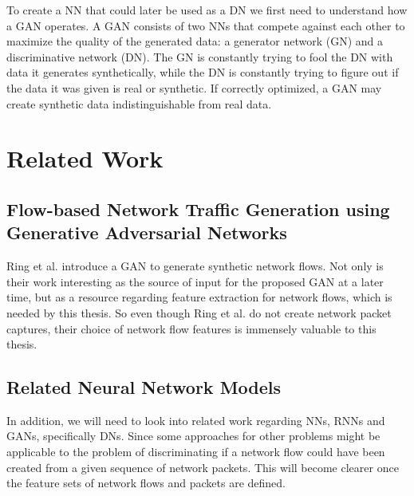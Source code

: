 \documentclass[
	ngerman,
	ruledheaders=section,%
	class=report,%
	thesis={type=bachelor},%
	accentcolor=9c,%
	custommargins=true,%
	marginpar=false,%
	parskip=half-,%
	fontsize=11pt,%
]{tudapub}
\begin{document}
To create a NN that could later be used as a DN we first need to understand how a GAN operates.
A GAN consists of two NNs that compete against each other to maximize the quality of the generated data:
a generator network (GN) and a discriminative network (DN).
The GN is constantly trying to fool the DN with data it generates synthetically,
while the DN is constantly trying to figure out if the data it was given is real or synthetic.
If correctly optimized, a GAN may create synthetic data indistinguishable from real data.

\chapter{Related Work}

\section{Flow-based Network Traffic Generation using Generative Adversarial Networks}

Ring et al. \cite{ringFlowbasedNetworkTraffic2019a} introduce a GAN to generate synthetic network flows.
Not only is their work interesting as the source of input for the proposed GAN at a later time,
but as a resource regarding feature extraction for network flows,
which is needed by this thesis.
So even though Ring et al. \cite{ringFlowbasedNetworkTraffic2019a} do not create network packet captures,
their choice of network flow features is immensely valuable to this thesis.

\section{Related Neural Network Models}

In addition, we will need to look into related work regarding NNs, RNNs and GANs, specifically DNs.
Since some approaches for other problems might be applicable to the problem of discriminating if a network flow could have been created from a given sequence of network packets.
This will become clearer once the feature sets of network flows and packets are defined.



\end{document}
